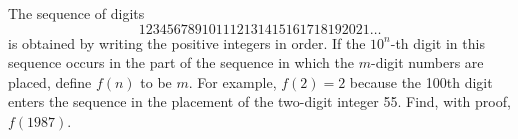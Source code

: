 The sequence of digits
\[
1 2 3 4 5 6 7 8 9 1 0 1 1 1 2 1 3 1 4 1 5 1 6 1 7 1 8 1 9 2 0 2 1 \dots
\]
is obtained by writing the positive integers in order. If the
$10^n$-th digit in this sequence occurs in the part of the sequence in
which the $m$-digit numbers are placed, define $f(n)$ to be $m$. For
example, $f(2)=2$ because the 100th digit enters the sequence in the
placement of the two-digit integer 55. Find, with proof, $f(1987)$.
